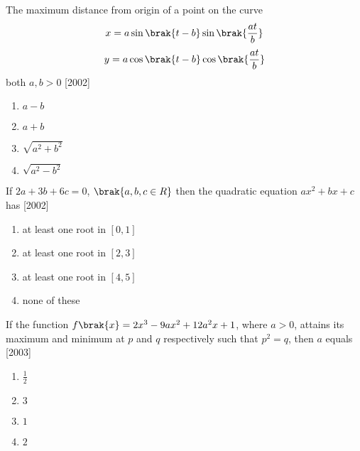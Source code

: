 \iffalse
  \title{APPLICATIONS OF DERIVATIVES}
  \author{HARSHILL RATHAN}
  \section{mains}
\fi

    \item The maximum distance from origin of a point on the curve \begin{align*}
    x = a \sin\brak{t-b} \sin\brak{\frac{at}{b}}
\end{align*}
\begin{align*}
     y = a \cos\brak{t-b} \cos\brak{\frac{at}{b}}
\end{align*} 
both $a, b > 0$ \hfill{[2002]}
\begin{multicols}{2}
\begin{enumerate}
    \item $a-b$
    \item $a+b$
    \item $\sqrt{a^2+b^2}$
    \item $\sqrt{a^2-b^2}$ 
\end{enumerate}
\end{multicols}
\item If $2a+3b+6c=0$, $\brak{a,b,c \in R}$ then the quadratic equation $ax^2+bx+c$ has \hfill{[2002]}
\begin{multicols}{2}
\begin{enumerate}
    \item at least one root in $[0,1]$
    \item at  least one root in $[2,3]$
    \item at least one root in $[4,5]$
    \item none of these \\
\end{enumerate}
\end{multicols}
\item If the function $f\brak{x}=2x^3-9ax^2+12a^2x+1$, where $a>0$, attains its maximum and minimum at $p$ and $q$ respectively such that $p
    ^2=q$, then $a$ equals  \hfill{[2003]}
\begin{multicols}{2}
\begin{enumerate}
       \item $\frac{1}{2}$
       \item $3$
       \item $1$
       \item $2$
\end{enumerate}
\end{multicols}
